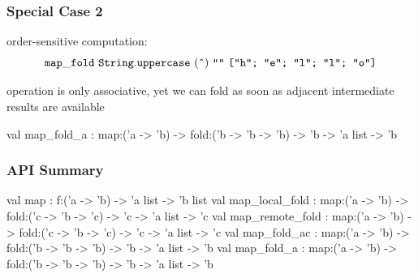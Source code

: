 \documentclass{beamer}
\let\emph\alert
\begin{document}
\begin{frame}\frametitle{Special Case 2}

  \emph{order-sensitive} computation:
  \begin{displaymath}
    \mathtt{map\_fold}~\mathtt{String.uppercase}~(\texttt{\^{}})~\texttt{""}~
    \texttt{["h"; "e"; "l"; "l"; "o"]}
  \end{displaymath}

  operation is only \emph{associative}, yet we can fold as soon as
  adjacent intermediate results are available



\begin{ocaml}
val map_fold_a :
  map:('a -> 'b) -> fold:('b -> 'b -> 'b) -> 
  'b -> 'a list -> 'b
\end{ocaml}
\end{frame}


\begin{frame}\frametitle{API Summary}
  \begin{ocaml}
val map : 
  f:('a -> 'b) -> 'a list -> 'b list
val map_local_fold :
  map:('a -> 'b) -> fold:('c -> 'b -> 'c) -> 
  'c -> 'a list -> 'c
val map_remote_fold :
  map:('a -> 'b) -> fold:('c -> 'b -> 'c) -> 
  'c -> 'a list -> 'c
val map_fold_ac :
  map:('a -> 'b) -> fold:('b -> 'b -> 'b) -> 
  'b -> 'a list -> 'b
val map_fold_a :
  map:('a -> 'b) -> fold:('b -> 'b -> 'b) -> 
  'b -> 'a list -> 'b
  \end{ocaml}
\end{frame}
\end{document}
